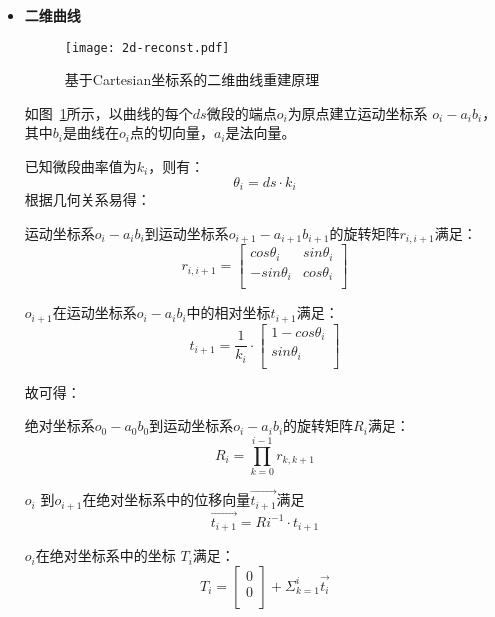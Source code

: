 \begin{itemize}

\item \textbf{二维曲线} \\

\begin{figure}[H]
\centering
\texttt{[image: 2d-reconst.pdf]}
\caption{基于Cartesian坐标系的二维曲线重建原理}
\label{fig:2d-reconst} 
\end{figure}

如图~\ref{fig:2d-reconst}所示，以曲线的每个$ds$微段的端点$o_i$为原点建立运动坐标系 $o_i-a_ib_i$，其中$b_i$是曲线在$o_i$点的切向量，$a_i$是法向量。

已知微段曲率值为$k_i$，则有：
\begin{equation}
\theta_i = ds\cdot k_i
\end{equation}
根据几何关系易得：

运动坐标系$o_i-a_ib_i$到运动坐标系$o_{i+1}-a_{i+1}b_{i+1}$的旋转矩阵$r_{i, i+1}$满足：
    \begin{equation}
    r_{i, i+1} = \left[
      \begin{matrix}
      cos \theta_i & sin \theta_i\\
      -sin \theta_i & cos \theta_i\\
      \end{matrix}
    \right]
    \end{equation}
    
$o_{i+1}$在运动坐标系$o_i-a_ib_i$中的相对坐标$t_{i+1}$满足：
    \begin{equation}
    t_{i+1} = \frac{1}{k_i} \cdot \left[
      \begin{matrix}
    	1 - cos\theta_i\\
      sin\theta_i\\
      \end{matrix}
    \right]
    \end{equation}
    

故可得：

绝对坐标系$o_0-a_0b_0$到运动坐标系$o_i-a_ib_i$的旋转矩阵$R_i$满足：
    \begin{equation}
    R_i = \prod_{k = 0}^{i-1} r_{k, k+1}
    \end{equation}

$o_i$ 到$o_{i+1}$在绝对坐标系中的位移向量$\vec{t_{i+1}}$满足
    \begin{equation}
    \vec{t_{i+1}} = Ri^{-1}\cdot t_{i+1}
    \end{equation}
    
$o_i$在绝对坐标系中的坐标 $T_i$满足：
    \begin{equation}
    T_i = \left[
    		\begin{matrix}
        0\\
        0\\
      	\end{matrix}
      \right]
      + \Sigma_{k=1} ^ {i} \vec{t_i}
    \end{equation}
    

\end{itemize}
